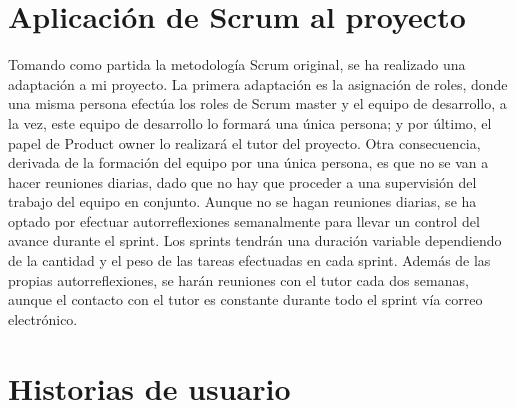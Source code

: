 \begin{table}[h]
\centering
{}
\caption{Comparativa de las metodologías de desarrollo}
\end{table}

\section{Aplicación de Scrum al proyecto} \label{sec:apli_scrum}

Tomando como partida la metodología Scrum original, se ha realizado una adaptación a mi proyecto. La primera adaptación es la asignación de roles, donde una misma persona efectúa los roles de Scrum master y el equipo de desarrollo, a la vez, este equipo de desarrollo lo formará una única persona; y por último, el papel de Product owner lo realizará el tutor del proyecto. Otra consecuencia, derivada de la formación del equipo por una única persona, es que no se van a hacer reuniones diarias, dado que no hay que proceder a una supervisión del trabajo del equipo en conjunto. Aunque no se hagan reuniones diarias, se ha optado por efectuar autorreflexiones semanalmente para llevar un control del avance durante el sprint. Los sprints tendrán una duración variable dependiendo de la cantidad y el peso de las tareas efectuadas en cada sprint. Además de las propias autorreflexiones, se harán reuniones con el tutor cada dos semanas, aunque el contacto con el tutor es constante durante todo el sprint vía correo electrónico.

\section{Historias de usuario} \label{sec:historias_usuario}

